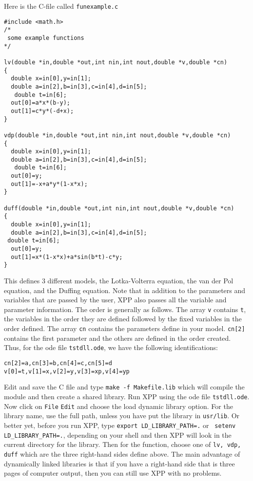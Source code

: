 \documentclass{article}
\begin{document}
Here is the C-file called {\tt funexample.c}
\begin{verbatim}
#include <math.h>
/*
 some example functions
*/

lv(double *in,double *out,int nin,int nout,double *v,double *cn)
{
  double x=in[0],y=in[1];
  double a=in[2],b=in[3],c=in[4],d=in[5];
   double t=in[6];
  out[0]=a*x*(b-y);
  out[1]=c*y*(-d+x);
}

vdp(double *in,double *out,int nin,int nout,double *v,double *cn)
{
  double x=in[0],y=in[1];
  double a=in[2],b=in[3],c=in[4],d=in[5];
   double t=in[6];
  out[0]=y;
  out[1]=-x+a*y*(1-x*x);
}

duff(double *in,double *out,int nin,int nout,double *v,double *cn)
{
  double x=in[0],y=in[1];
  double a=in[2],b=in[3],c=in[4],d=in[5];
 double t=in[6];
  out[0]=y;
  out[1]=x*(1-x*x)+a*sin(b*t)-c*y;
}
\end{verbatim}
This defines 3 different models, the Lotka-Volterra equation,
the van der Pol equation, and the Duffing equation. Note that in
addition to the parameters and variables that are passed by the user,
XPP also passes all the variable and parameter information. The order
is generally as follows. The array {\tt v} contains {\tt t},
the variables in the order they are defined followed by the fixed
variables in the order defined. The array {\tt cn} contains the
parameters define in your model. {\tt cn[2]} contains the first
parameter and the others are defined in the order created. Thus, for
the ode file {\tt tstdll.ode}, we have the following identifications:
\begin{verbatim}
cn[2]=a,cn[3]=b,cn[4]=c,cn[5]=d
v[0]=t,v[1]=x,v[2]=y,v[3]=xp,v[4]=yp
\end{verbatim}




Edit and save the C file and
type {\tt make -f Makefile.lib} which will compile the
module and then create a shared library.  Run XPP using the ode file
{\tt tstdll.ode}. Now click on {\tt File} {\tt Edit} and choose the
load dynamic library option. For the library name, use the full path,
unless you have put the library in {\tt usr/lib}. Or better yet,
before you run XPP, type {\tt export LD\_LIBRARY\_PATH=.} or {\tt
setenv LD\_LIBRARY\_PATH=.}, depending on your shell and then XPP will
look in the current directory for the library.
Then for the
function, choose one of {\tt lv, vdp, duff} which are the three
right-hand sides define above.  The main advantage of dynamically
linked libraries is that if you have a right-hand side that is three
pages of computer output, then you can still use XPP with no
problems.
\end{document}
